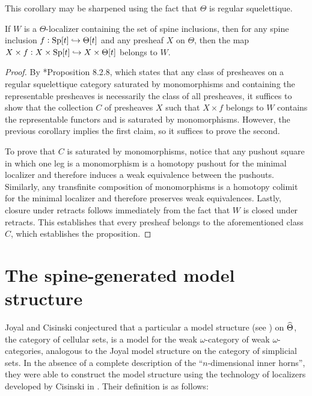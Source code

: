 This corollary may be sharpened using the fact that \(\Theta\) is regular squelettique.

\begin{prop}\label{cartesianness} If \(W\) is a \(\Theta\)-localizer containing the set of spine inclusions, then for any spine inclusion \(f:{\operatorname{Sp}}[t]\hookrightarrow \Theta[t]\) and any presheaf \(X\) on \(\Theta\), then the map \(X\times f: X\times {\operatorname{Sp}}[t]\hookrightarrow X\times \Theta[t]\) belongs to \(W\).
\end{prop}
\begin{proof} By \cite{cisinski-book}*{Proposition 8.2.8}, which states that any class of presheaves on a regular squelettique category saturated by monomorphisms and containing the representable presheaves is necessarily the class of all presheaves, it suffices to show that the collection \(C\) of presheaves \(X\) such that \(X\times f\) belongs to \(W\) contains the representable functors and is saturated by monomorphisms.  However, the previous corollary implies the first claim, so it suffices to prove the second. 

To prove that \(C\) is saturated by monomorphisms, notice that any pushout square in which one leg is a monomorphism is a homotopy pushout for the minimal localizer and therefore induces a weak equivalence between the pushouts.  Similarly, any transfinite composition of monomorphisms is a homotopy colimit for the minimal localizer and therefore preserves weak equivalences.  Lastly, closure under retracts follows immediately from the fact that \(W\) is closed under retracts.  This establishes that every presheaf belongs to the aforementioned class \(C\), which establishes the proposition.
\end{proof}

\section{The spine-generated model structure}
Joyal and Cisinski conjectured that a particular a model structure (see \cite{joyal-quategory}) on \(\widehat{\Theta}\), the category of cellular sets, is a model for the weak \(\omega\)-category of weak \(\omega\)-categories, analogous to the Joyal model structure on the category of simplicial sets.  In the absence of a complete description of the ``\(n\)-dimensional inner horns'', they were able to construct the model structure using the technology of localizers developed by Cisinski in \cite{cisinski-book}. Their definition is as follows:

